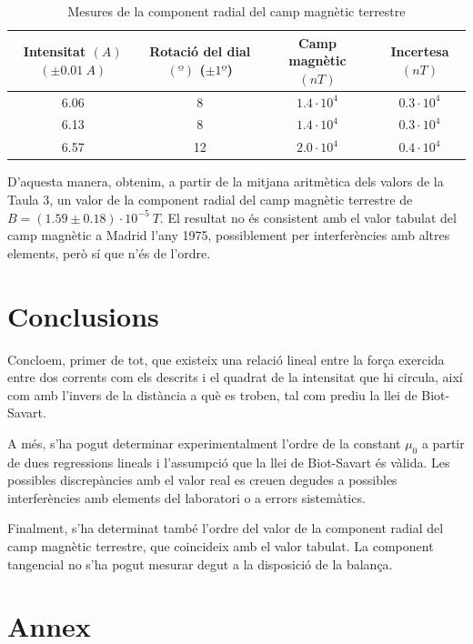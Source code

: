 \documentclass[a4paper,11pt]{article}
\begin{document}
\begin{table}
	\centering
	\caption{Mesures de la component radial del camp magnètic terrestre}
	\vspace{0.5cm}
	\begin{tabular}{|c|c|c|c|}
		\hline
		\textbf{Intensitat} $\si{(A)}$ $(\pm0.01\ \si{A})$&\textbf{Rotació del dial} $\si{(º)}$ ($\pm 1º$)&\textbf{Camp magnètic} $\si{(nT)}$ & \textbf{Incertesa} $\si{(nT)}$\\ \hline
		6.06 & 8 &$1.4\cdot10^{4}$ & $0.3\cdot10^{4}$ \\ \hline
		6.13 & 8  &$1.4\cdot10^{4}$  &$0.3\cdot10^{4}$ \\ \hline 
		6.57 & 12 &$2.0\cdot10^{4}$  &$0.4\cdot10^{4}$ \\ \hline 

	\end{tabular}
\end{table}
D'aquesta manera, obtenim, a partir de la mitjana aritmètica dels valors de la Taula 3, un valor de la component radial del camp magnètic terrestre de $B=(1.59\pm0.18)\cdot10^{-5}\ \si{T}$. El resultat no és consistent amb el valor tabulat del camp magnètic a Madrid l'any 1975, possiblement per interferències amb altres elements, però sí que n'és de l'ordre.

\section{Conclusions}
Concloem, primer de tot, que existeix una relació lineal entre la força exercida entre dos corrents com els descrits i el quadrat de la intensitat que hi circula, així com amb l'invers de la distància a què es troben, tal com prediu la llei de Biot-Savart.

A més, s'ha pogut determinar experimentalment l'ordre de la constant $\mu_0$ a partir de dues regressions lineals i l'assumpció que la llei de Biot-Savart és vàlida. Les possibles discrepàncies amb el valor real es creuen degudes a possibles interferències amb elements del laboratori o a errors sistemàtics.

Finalment, s'ha determinat també l'ordre del valor de la component radial del camp magnètic terrestre, que coincideix amb el valor tabulat. La component tangencial no s'ha pogut mesurar degut a la disposició de la balança.


\section*{Annex}
\end{document}
